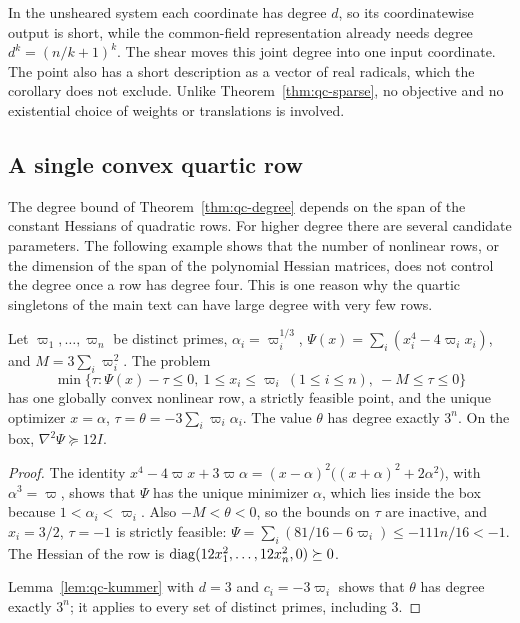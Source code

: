 In the unsheared system each coordinate has degree $d$, so its coordinatewise
output is short, while the common-field representation already needs degree
$d^k=(n/k+1)^k$. The shear moves this joint degree into one input coordinate.
The point also has a short description as a vector of real radicals, which
the corollary does not exclude. Unlike Theorem~\ref{thm:qc-sparse}, no
objective and no existential choice of weights or translations is involved.

\subsection{A single convex quartic row}
\label{app:qc-quartic}

The degree bound of Theorem~\ref{thm:qc-degree} depends on the span of the
constant Hessians of quadratic rows. For higher degree there are several
candidate parameters. The following example shows that the number of nonlinear
rows, or the dimension of the span of the polynomial Hessian matrices, does not
control the degree once a row has degree four. This is one reason why the quartic
singletons of the main text can have large degree with very few rows.

\begin{proposition}
\label{prop:qc-quartic}
Let $\varpi_1,\ldots,\varpi_n$ be distinct primes, $\alpha_i=\varpi_i^{1/3}$,
$\Psi(x)=\sum_i(x_i^4-4\varpi_ix_i)$, and $M=3\sum_i\varpi_i^2$. The problem
\[
\min\{\tau: \Psi(x)-\tau\le0,\ 1\le x_i\le\varpi_i\ (1\le i\le n),\
-M\le\tau\le0\}
\]
has one globally convex nonlinear row, a strictly feasible point, and the
unique optimizer $x=\alpha$, $\tau=\theta=-3\sum_i\varpi_i\alpha_i$. The value
$\theta$ has degree exactly $3^n$. On the box, $\nabla^2\Psi\succeq12I$.
\end{proposition}

\begin{proof}
The identity
$x^4-4\varpi x+3\varpi\alpha=(x-\alpha)^2\bigl((x+\alpha)^2+2\alpha^2\bigr)$,
with $\alpha^3=\varpi$, shows that $\Psi$ has the unique minimizer $\alpha$, which
lies inside the box because $1<\alpha_i<\varpi_i$. Also $-M<\theta<0$, so the
bounds on $\tau$ are inactive, and $x_i=3/2$, $\tau=-1$ is strictly feasible:
$\Psi=\sum_i(81/16-6\varpi_i)\le-111n/16<-1$. The Hessian of the row is
$\operatorname{diag}(12x_1^2,\ldots,12x_n^2,0)\succeq0$.

Lemma~\ref{lem:qc-kummer} with $d=3$ and $c_i=-3\varpi_i$ shows that
$\theta$ has degree exactly $3^n$; it applies to every set of distinct primes,
including $3$.
\end{proof}

